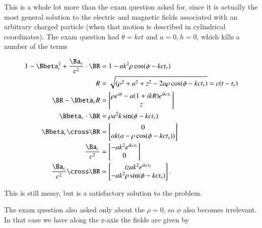 {This is a whole lot more than the exam question asked for, since it is actually the most general solution to the electric and magnetic fields associated with an arbitrary charged particle (when that motion is described in cylindrical coordinates).  The exam question had \(\theta = k c t\) and \(\dot{a} = 0, h = 0\), which kills a number of the terms

\begin{equation}\label{eqn:relativisticElectrodynamicsExamReflection:1010}
\begin{aligned}
1 - \Bbeta_c^2 + \frac{\Ba_c}{c^2} \cdot \BR &= 1 - a k^2 \rho \cos(\phi -  k c t_r) \\
R &= \sqrt{(\rho^2 + a^2 + z^2 - 2 a \rho \cos(\phi - k c t_r)} = c( t - t_r) \\
\BR - \Bbeta_c R &=
\begin{bmatrix}
\rho e^{i\phi} - a (1 + i k R) e^{i k c t_r} \\
z
\end{bmatrix} \\
\Bbeta_c \cdot \BR &= \rho a^2 k \sin(\phi -  k c t_r) \\
\Bbeta_c \cross \BR
&=
\begin{bmatrix}
0 \\
a k ( a - \rho \cos(\phi -  k c t_r) )
\end{bmatrix} \\
\frac{\Ba_c}{c^2} &=
\begin{bmatrix}
- a k^2 e^{i k c t_r} \\
0
\end{bmatrix} \\
\frac{\Ba_c}{c^2} \cross \BR
&=
\begin{bmatrix}
i z a k^2 e^{i k c t_r} \\
- a k^2 \rho \sin(\phi -  k c t_r)
\end{bmatrix}.
\end{aligned}
\end{equation}

This is still messy, but is a satisfactory solution to the problem.

The exam question also asked only about the \(\rho = 0\), so \(\phi\) also becomes irrelevant.  In that case we have along the z-axis the fields are given by

}
